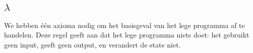 \subsection{$\lambda$}
\label{sec:rules:lambda}

We hebben één axioma nodig om het basisgeval van het lege programma af te
handelen. Deze regel geeft aan dat het lege programma niets doet: het gebruikt
geen input, geeft geen output, en verandert de state niet.
\therlambdans%
